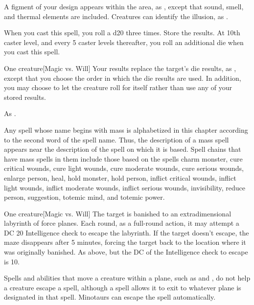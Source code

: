 \spelldur{\durshort}
\spellline
\spelleffect A figment of your design appears within the area, as , except that sound, smell, and thermal elements are included.
\spellnotes Creatures can identify the illusion, as .

\spellrng{\rngmed}
\spellspecial When you cast this spell, you roll a d20 three times. Store the results. At 10th caster level, and every 5 caster levels thereafter, you roll an additional die when you cast this spell.
\begin{spelltarget}{One creature}[Magic vs. Will]
    \spellsuccess Your results replace the target's die results, as , except that you choose the order in which the die results are used. In addition, you may choose to let the creature roll for itself rather than use any of your stored results.
\end{spelltarget}
\spellnotes As .

\par Any spell whose name begins with mass is alphabetized in this chapter according to the second word of the spell name. Thus, the description of a mass spell appears near the description of the spell on which it is based. Spell chains that have mass spells in them include those based on the spells charm monster, cure critical wounds, cure light wounds, cure moderate wounds, cure serious wounds, enlarge person, heal, hold monster, hold person, inflict critical wounds, inflict light wounds, inflict moderate wounds, inflict serious wounds, invisibility, reduce person, suggestion, totemic mind, and totemic power.

\spellrng{\rngmed}
\begin{spelltarget}{One creature}[Magic vs. Will]
    \spellsuccess The target is banished to an extradimensional labyrinth of force planes. Each round, as a full-round action, it may attempt a DC 20 Intelligence check to escape the labyrinth. If the target doesn't escape, the maze disappears after 5 minutes, forcing the target back to the location where it was originally banished.
    \spellfailure As above, but the DC of the Intelligence check to escape is 10.
\end{spelltarget}
\spellnotes Spells and abilities that move a creature within a plane, such as  and , do not help a creature escape a  spell, although a  spell allows it to exit to whatever plane is designated in that spell. Minotaurs can escape the spell automatically.

